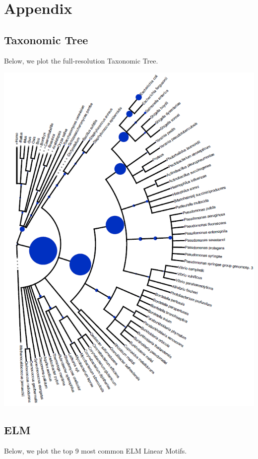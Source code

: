 \documentclass[10pt,twocolumn,letterpaper]{article}
\begin{document}
\section{Appendix}


\subsection{Taxonomic Tree}
\label{sec:taxtree}

Below, we plot the full-resolution Taxonomic Tree. \\
\begin{center}
    \includegraphics[]{report/img/taxonomy_tree.png}
\end{center}

\subsection{ELM}

Below, we plot the top 9 most common ELM Linear Motifs. \\
\end{document}
